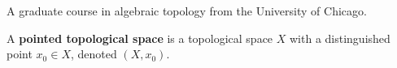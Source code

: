 A graduate course in algebraic topology from the University of Chicago. 

\begin{definition}
  \label{def:pointed-topological-space}
  A \textbf{pointed topological space} is a topological space $X$ with a distinguished point $x_0 \in X$, denoted $(X, x_0)$. 
\end{definition}

